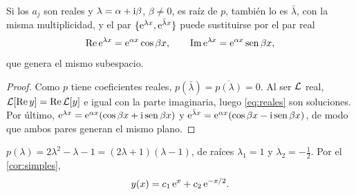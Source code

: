 \begin{proposicion}\label{prop:reales}
Si los $a_j$ son reales y $\lambda=\alpha+\mathrm{i}\beta$, $\beta\neq0$, es raíz de
$p$, también lo es $\bar\lambda$, con la misma multiplicidad, y el par
$\{\mathrm{e}^{\lambda x},\mathrm{e}^{\bar\lambda x}\}$ puede sustituirse por el par
real
\begin{equation}\label{eq:reales}
  \operatorname{Re}\mathrm{e}^{\lambda x}=\mathrm{e}^{\alpha x}\cos\beta x,\qquad
  \operatorname{Im}\mathrm{e}^{\lambda x}=\mathrm{e}^{\alpha x}\operatorname{sen}\beta x ,
\end{equation}
que genera el mismo subespacio.
\end{proposicion}

\begin{proof}
Como $p$ tiene coeficientes reales, $p(\bar\lambda)=\overline{p(\lambda)}=0$.
Al ser $\mathcal{L}$ real, $\mathcal{L}[\operatorname{Re} y]=\operatorname{Re}\mathcal{L}[y]$ e igual con la parte
imaginaria, luego \eqref{eq:reales} son soluciones. Por último,
$\mathrm{e}^{\lambda x}=\mathrm{e}^{\alpha x}(\cos\beta x+\mathrm{i}\operatorname{sen}\beta x)$ y
$\mathrm{e}^{\bar\lambda x}=\mathrm{e}^{\alpha x}(\cos\beta x-\mathrm{i}\operatorname{sen}\beta x)$, de
modo que ambos pares generan el mismo plano.
\end{proof}

\begin{ejemplo}[$2y''-y'-y=0$]\label{ej:simple}
$p(\lambda)=2\lambda^{2}-\lambda-1=(2\lambda+1)(\lambda-1)$, de raíces
$\lambda_1=1$ y $\lambda_2=-\tfrac12$. Por el \cref{cor:simples},
\begin{equation}\label{eq:ej-simple}
  y(x)=c_1\,\mathrm{e}^{x}+c_2\,\mathrm{e}^{-x/2}.
\end{equation}
\end{ejemplo}

